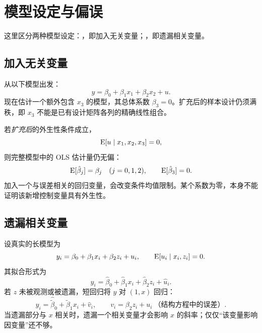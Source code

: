 \section{模型设定与偏误}
\label{sec:model-specification}
这里区分两种模型设定：，即加入无关变量；，即遗漏相关变量。

\subsection{加入无关变量}
从以下模型出发：
\[y=\beta_0+\beta_1x_1+\beta_2x_2+u.\]
现在估计一个额外包含 $x_3$ 的模型，其总体系数 $\beta_3=0$。扩充后的样本设计仍须满秩，即 $x_3$ 不能是已有设计矩阵各列的精确线性组合。

若\emph{扩充后}的外生性条件成立，
\[\operatorname{E}[u\mid x_1,x_2,x_3]=0,
\]
则完整模型中的 OLS 估计量仍无偏：
\[\operatorname{E}[\hat\beta_j]=\beta_j\quad(j=0,1,2),\qquad
\operatorname{E}[\hat\beta_3]=0.
\]
加入一个与误差相关的回归变量，会改变条件均值限制。某个系数为零，本身不能证明该新增控制变量具有外生性。


\subsection{遗漏相关变量}
\label{sec:ovb-sample}
设真实的长模型为
\[y_i=\beta_0+\beta_1x_i+\beta_2z_i+u_i,\qquad
\operatorname{E}[u_i\mid x_i,z_i]=0.\]
其拟合形式为
\[y_i=\hat\beta_0+\hat\beta_1x_i+\hat\beta_2z_i+\hat u_i.
\]
若 $z$ 未被观测或被遗漏，短回归将 $y$ 对 $(1,x)$ 回归：
\[y_i=\hat{\tilde\beta}_0+\hat{\tilde\beta}_1x_i+\hat v_i,
\qquad v_i=\beta_2z_i+u_i\ \text{（结构方程中的误差）}.
\]
当遗漏部分与 $x$ 相关时，遗漏一个相关变量才会影响 $x$ 的斜率；仅仅“该变量影响因变量”还不够。

